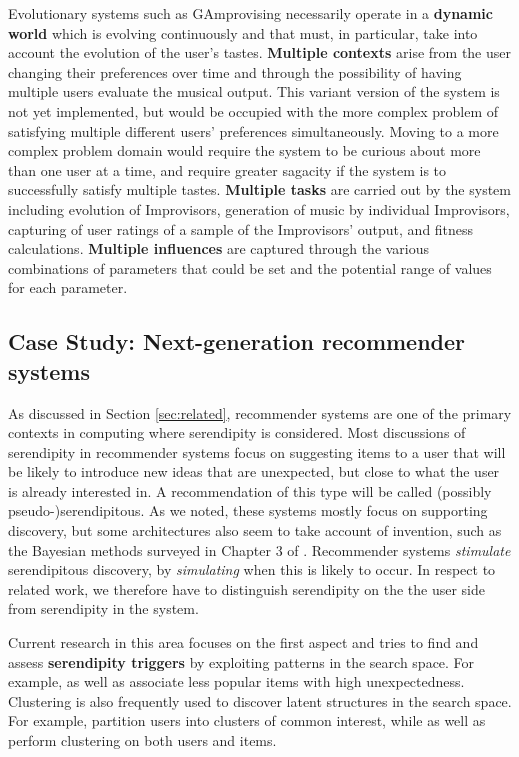 Evolutionary systems such as {\sf GAmprovising} necessarily operate in a \textbf{dynamic world} which is evolving continuously and that must, in particular, take into account the evolution of the user's tastes. \textbf{Multiple contexts} arise from  the user changing their preferences over time and through the possibility of having multiple users evaluate the musical output.  This variant version of the system is not yet implemented, but would be occupied with the more complex problem of satisfying multiple different users' preferences simultaneously.  Moving to a more complex problem domain would require the system to be curious about more than one user at a time, and require greater sagacity if the system is to successfully satisfy multiple tastes.  \textbf{Multiple tasks} are carried out by the system including evolution of Improvisors, generation of music by individual Improvisors, capturing of user ratings of a sample of the Improvisors' output, and fitness calculations.  \textbf{Multiple influences} are captured through the various combinations of parameters that could be set and the potential range of values for each parameter. 

\subsection{Case Study: Next-generation recommender systems}
As discussed in Section \ref{sec:related}, recommender systems are one
of the primary contexts in computing where serendipity is considered. Most discussions of serendipity in recommender systems focus on suggesting items to a user that will be likely to introduce new ideas that are unexpected, but close to what the user is already interested in. A recommendation of this type will be called (possibly \mbox{pseudo-)serendipitous}. As we noted, these systems mostly focus on supporting discovery, but some architectures also seem to take account of invention, such as the Bayesian methods surveyed in Chapter 3 of . Recommender systems \emph{stimulate} serendipitous discovery, by \emph{simulating} when this is likely to occur. In respect to related work, we therefore have to distinguish serendipity on the the user side from serendipity in the system. 

Current research in this area focuses on the first aspect and tries to find and assess \textbf{serendipity triggers} by exploiting patterns in the search space. For example,  as well as  associate less popular items with high unexpectedness. Clustering is also frequently used to discover latent structures in the search space. For example,  partition users into clusters of common interest, while  as well as  perform clustering on both users and items. %

